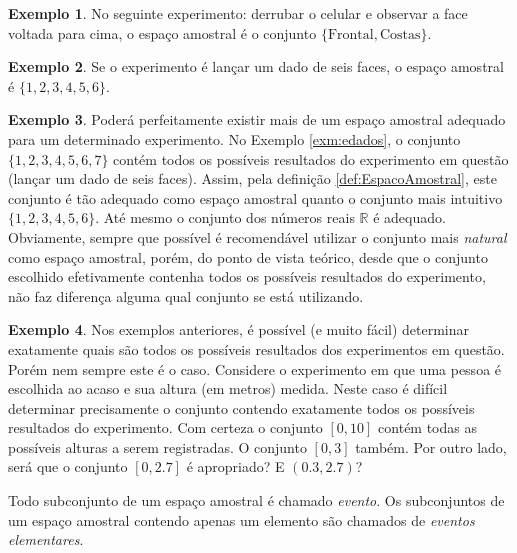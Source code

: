 \documentclass[
]{book}
\theoremstyle{definition}
\theoremstyle{definition}
\newtheorem{example}{Exemplo}[chapter]
\theoremstyle{definition}
\theoremstyle{remark}
\begin{document}
\begin{example}
\protect\hypertarget{exm:exampcel}{}{\label{exm:exampcel} }No seguinte experimento: derrubar o celular e observar a face voltada para cima, o espaço amostral é o conjunto \(\{\mathrm{Frontal}, \mathrm{Costas}\}\).
\end{example}

\begin{example}
\protect\hypertarget{exm:edados}{}{\label{exm:edados} }Se o experimento é lançar um dado de seis faces, o espaço amostral é \(\{1,2,3,4,5,6\}\).
\end{example}

\begin{example}
\protect\hypertarget{exm:exampespamost}{}{\label{exm:exampespamost} }Poderá perfeitamente existir mais de um espaço amostral adequado para um determinado experimento. No Exemplo \ref{exm:edados}, o conjunto \(\{1,2,3,4,5,6,7\}\) contém todos os possíveis resultados do experimento em questão (lançar um dado de seis faces). Assim, pela definição \ref{def:EspacoAmostral}, este conjunto é tão adequado como espaço amostral quanto o conjunto mais intuitivo \(\{1,2,3,4,5,6\}\). Até mesmo o conjunto dos números reais \(\mathbb{R}\) é adequado. Obviamente, sempre que possível é recomendável utilizar o conjunto mais \emph{natural} como espaço amostral, porém, do ponto de vista teórico, desde que o conjunto escolhido efetivamente contenha todos os possíveis resultados do experimento, não faz diferença alguma qual conjunto se está utilizando.
\end{example}

\begin{example}
\protect\hypertarget{exm:examexp}{}{\label{exm:examexp} }Nos exemplos anteriores, é possível (e muito fácil) determinar exatamente quais são todos os possíveis resultados dos experimentos em questão. Porém nem sempre este é o caso. Considere o experimento em que uma pessoa é escolhida ao acaso e sua altura (em metros) medida. Neste caso é difícil determinar precisamente o conjunto contendo exatamente todos os possíveis resultados do experimento. Com certeza o conjunto \([0,10]\) contém todas as possíveis alturas a serem registradas. O conjunto \([0,3]\) também. Por outro lado, será que o conjunto \([0,2.7]\) é apropriado? E \((0.3,2.7)\)?
\end{example}

Todo subconjunto de um espaço amostral é chamado \emph{evento}. Os
subconjuntos de um espaço amostral contendo apenas um elemento são
chamados de \emph{eventos elementares}.
\end{document}
